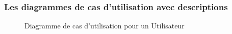 \documentclass[12pt]{report}
\begin{document}
\vspace{-0.3in}

\subsubsection{\large{Les diagrammes de cas d'utilisation avec descriptions}}

\vspace{-0.1in}

\begin{figure}[h]
\centering
  \vspace{-0.1in}
    \centerline{}
    \caption{Diagramme de cas d'utilisation pour un Utilisateur}
\end{figure}

\newpage
\end{document}

